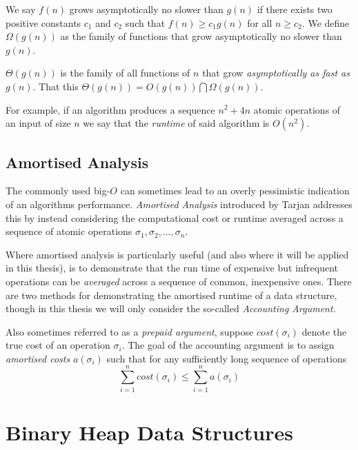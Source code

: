 \begin{definition}
    We say $f(n)$ grows asymptotically no slower than $g(n)$ if there exists two positive constants $c_1$ and $c_2$ such that $f(n)\geq c_1 g(n)$ for all $n\geq c_2$. We define $\Omega(g(n))$ as the family of functions that grow asymptotically no slower than $g(n)$.
\end{definition}

\begin{definition} $\Theta(g(n))$ is the family of all functions of $n$ that grow \textit{asymptotically as fast as $g(n)$}. That this $\Theta(g(n)) = O(g(n))\bigcap\Omega(g(n))$.
\end{definition}

For example, if an algorithm produces a sequence $n^2+4n$ atomic operations of an input of size $n$ we say that the \textit{runtime} of said algorithm is $O(n^2)$. 

\subsection{Amortised Analysis}
\label{ssec:amortised-analysis}

The commonly used big-$O$ can sometimes lead to an overly pessimistic indication of an algorithms performance. \textit{Amortised Analysis} introduced by Tarjan \cite{doi:10.1137/0606031} addresses this by instead considering the computational cost or runtime averaged across a sequence of atomic operations $\sigma_1, \sigma_2, \dots, \sigma_n$. 

Where amortised analysis is particularly useful (and also where it will be applied in this thesis), is to demonstrate that the run time of expensive but infrequent operations can be \textit{averaged} across a sequence of common, inexpensive ones. There are two methods for demonstrating the amortised runtime of a data structure, though in this thesis we will only consider the so-called \textit{Accounting Argument.} 

Also sometimes referred to as a \textit{prepaid argument}, suppose $cost(\sigma_i)$ denote the true cost of an operation $\sigma_i$. The goal of the accounting argument is to assign \textit{amortised costs} $a(\sigma_i)$ such that for any sufficiently long sequence of operations
$$\sum_{i=1}^{n}cost(\sigma_i)\leq\sum_{i=1}^{n}a(\sigma_i)$$


\newpage
\section{Binary Heap Data Structures}
\label{sec:heap-data-structs}


